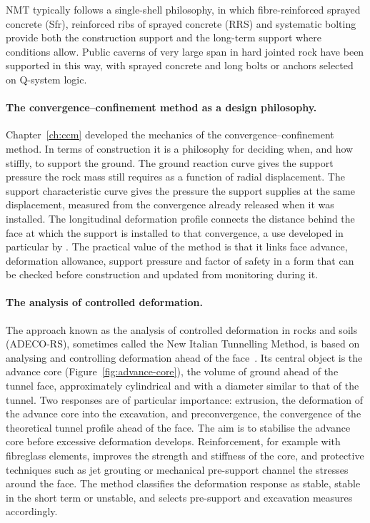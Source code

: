 NMT typically follows a single-shell philosophy, in which fibre-reinforced
sprayed concrete (Sfr), reinforced ribs of sprayed concrete (RRS) and
systematic bolting provide both the construction support and the long-term
support where conditions allow. Public caverns of very large span in hard
jointed rock have been supported in this way, with sprayed concrete and long
bolts or anchors selected on Q-system logic.

\paragraph{The convergence--confinement method as a design philosophy.}
\label{sec:ccm-as-philosophy}
Chapter~\ref{ch:ccm} developed the mechanics of the convergence--confinement
method. In terms of construction it is a philosophy for deciding when, and
how stiffly, to support the ground. The ground reaction curve gives the
support pressure the rock mass still requires as a function of radial
displacement. The support characteristic curve gives the pressure the support
supplies at the same displacement, measured from the convergence already
released when it was installed. The longitudinal deformation profile connects
the distance behind the face at which the support is installed to that
convergence, a use developed in particular by \citet{panet1995ccm}. The
practical value of the method is that it links face advance, deformation
allowance, support pressure and factor of safety in a form that can be
checked before construction and updated from monitoring during it.

\paragraph{The analysis of controlled deformation.}
\label{sec:adeco-rs}
The approach known as the analysis of controlled deformation in rocks and
soils (ADECO-RS), sometimes called the New Italian Tunnelling Method, is
based on analysing and controlling deformation ahead of the
face~\citep{lunardi2008adeco}. Its central object is the advance core
(Figure~\ref{fig:advance-core}), the
volume of ground ahead of the tunnel face, approximately cylindrical and with
a diameter similar to that of the tunnel. Two responses are of particular
importance: extrusion, the deformation of the advance core into the
excavation, and preconvergence, the convergence of the theoretical tunnel
profile ahead of the face. The aim is to stabilise the advance core before
excessive deformation develops. Reinforcement, for example with fibreglass
elements, improves the strength and stiffness of the core, and protective
techniques such as jet grouting or mechanical pre-support channel the
stresses around the face. The method classifies the deformation response as
stable, stable in the short term or unstable, and selects pre-support and
excavation measures accordingly.

